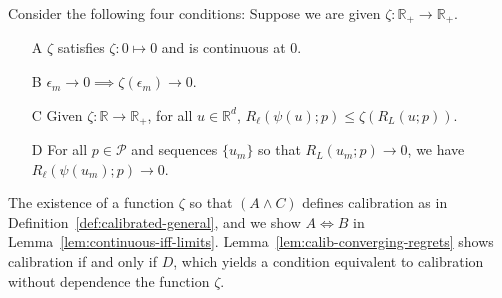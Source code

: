 \documentclass[anon,12pt]{colt2021} %
\newcommand{\reals}{\mathbb{R}}
\renewcommand{\P}{\mathcal{P}}
\begin{document}
Consider the following four conditions: Suppose we are given $\zeta:\reals_+ \to \reals_+$.
\begin{enumerate}
	\item [A] $\zeta$ satisfies $\zeta : 0 \mapsto 0$ and is continuous at $0$.
	\item [B] $\epsilon_m \to 0 \implies \zeta(\epsilon_m) \to 0$.
	\item [C] Given $\zeta:\reals \to \reals_+$, for all $u \in \reals^d$, $R_\ell(\psi(u); p) \leq \zeta(R_L(u;p))$.
	\item [D] For all $p \in \P$ and sequences $\{u_m\}$ so that $R_L(u_m; p) \to 0$, we have $R_\ell(\psi(u_m); p) \to 0$.
\end{enumerate}
The existence of a function $\zeta$ so that $(A \wedge C)$ defines calibration as in Definition~\ref{def:calibrated-general}, and we show $A \iff B$ in Lemma~\ref{lem:continuous-iff-limits}.  
Lemma~\ref{lem:calib-converging-regrets} shows calibration if and only if $D$, which yields a condition equivalent to calibration without dependence the function $\zeta$.
\end{document}
